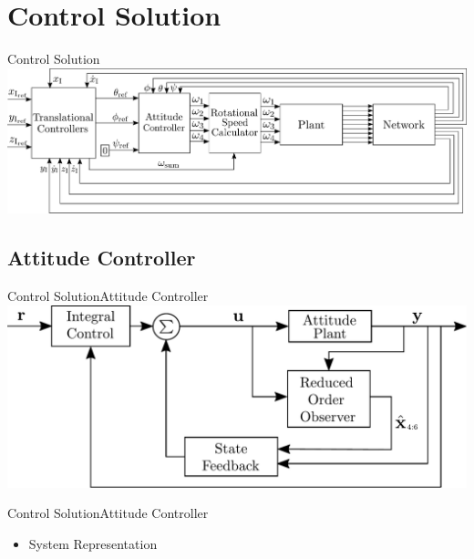 \section{Control Solution}
\begin{frame}{Control Solution}{}
    \centering
    \includegraphics[scale=0.2]{figures/ControlDiagramPoster}
\end{frame}

\subsection{Attitude Controller}
\begin{frame}{Control Solution}{Attitude Controller}
    \centering
    \includegraphics[scale=0.35]{figures/AttitudeControlDiagram}    
\end{frame}

\begin{frame}{Control Solution}{Attitude Controller}
    \begin{itemize}
        \item System Representation
    \end{itemize}

%        
\end{frame}


